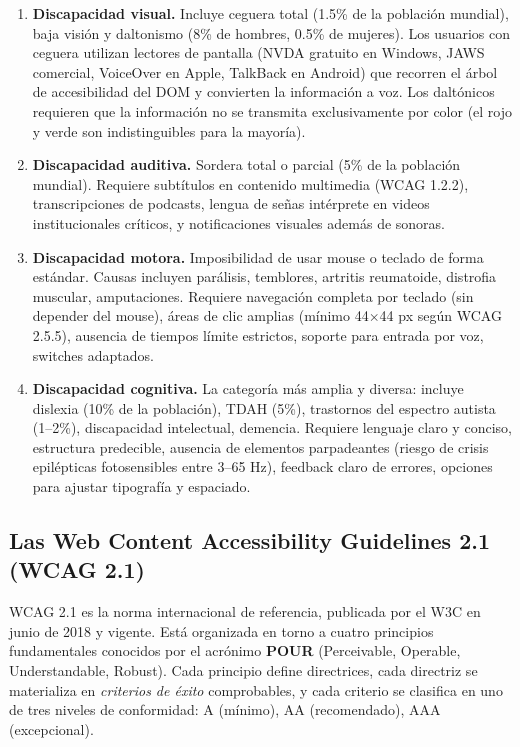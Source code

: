 \documentclass[11pt,a4paper,openany]{book}
\begin{document}
\begin{enumerate}
\item \textbf{Discapacidad visual.} Incluye ceguera total (1.5\% de
la población mundial), baja visión y daltonismo (8\% de hombres,
0.5\% de mujeres). Los usuarios con ceguera utilizan lectores de
pantalla (NVDA gratuito en Windows, JAWS comercial, VoiceOver en
Apple, TalkBack en Android) que recorren el árbol de accesibilidad
del DOM y convierten la información a voz. Los daltónicos requieren
que la información no se transmita exclusivamente por color (el rojo
y verde son indistinguibles para la mayoría).

\item \textbf{Discapacidad auditiva.} Sordera total o parcial (5\% de
la población mundial). Requiere subtítulos en contenido multimedia
(WCAG 1.2.2), transcripciones de podcasts, lengua de señas
intérprete en videos institucionales críticos, y notificaciones
visuales además de sonoras.

\item \textbf{Discapacidad motora.} Imposibilidad de usar mouse o
teclado de forma estándar. Causas incluyen parálisis, temblores,
artritis reumatoide, distrofia muscular, amputaciones. Requiere
navegación completa por teclado (sin depender del mouse), áreas de
clic amplias (mínimo 44$\times$44 px según WCAG 2.5.5), ausencia de
tiempos límite estrictos, soporte para entrada por voz, switches
adaptados.

\item \textbf{Discapacidad cognitiva.} La categoría más amplia y
diversa: incluye dislexia (10\% de la población), TDAH (5\%),
trastornos del espectro autista (1--2\%), discapacidad intelectual,
demencia. Requiere lenguaje claro y conciso, estructura predecible,
ausencia de elementos parpadeantes (riesgo de crisis epilépticas
fotosensibles entre 3--65 Hz), feedback claro de errores, opciones
para ajustar tipografía y espaciado.
\end{enumerate}

\subsection{Las Web Content Accessibility Guidelines 2.1 (WCAG 2.1)}

WCAG 2.1 \cite{w3c2018wcag} es la norma internacional de referencia,
publicada por el W3C en junio de 2018 y vigente. Está organizada en
torno a cuatro principios fundamentales conocidos por el acrónimo
\textbf{POUR} (Perceivable, Operable, Understandable, Robust). Cada
principio define directrices, cada directriz se materializa en
\emph{criterios de éxito} comprobables, y cada criterio se clasifica
en uno de tres niveles de conformidad: A (mínimo), AA (recomendado),
AAA (excepcional).
\end{document}
